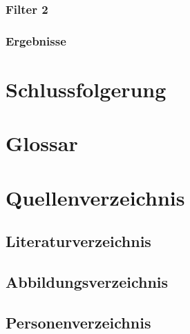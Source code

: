 \documentclass[12pt,a4paper, ngerman]{article}
\begin{document}
\subsubsection{Filter 2}

\subsubsection{Ergebnisse}

\section{Schlussfolgerung}




\newpage
\section{Glossar}


\newpage
\section{Quellenverzeichnis}
\subsection{Literaturverzeichnis}
\printbibliography
\subsection{Abbildungsverzeichnis}
\listoffigures
\subsection{Personenverzeichnis}
\newpage
\end{document}
